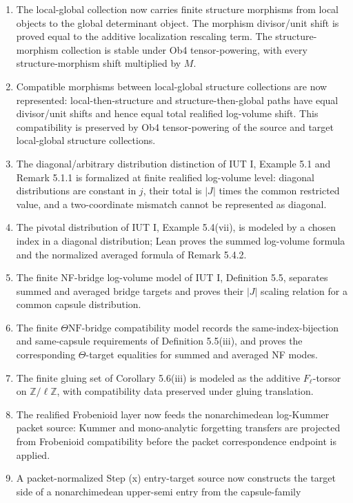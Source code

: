 \documentclass[11pt]{article}
\newcommand{\IUT}{IUT}
\newcommand{\Lean}{Lean}
\theoremstyle{plain}
\theoremstyle{definition}
\theoremstyle{remark}
\begin{document}
\begin{enumerate}
\item The local-global collection now carries finite structure morphisms from
  local objects to the global determinant object.  The morphism divisor/unit
  shift is proved equal to the additive localization rescaling term.  The
  structure-morphism collection is stable under Ob4 tensor-powering, with every
  structure-morphism shift multiplied by \(M\).
\item Compatible morphisms between local-global structure collections are now
  represented: local-then-structure and structure-then-global paths have equal
  divisor/unit shifts and hence equal total realified log-volume shift.  This
  compatibility is preserved by Ob4 tensor-powering of the source and target
  local-global structure collections.
\item The diagonal/arbitrary distribution distinction of \IUT{} I, Example 5.1
  and Remark 5.1.1 is formalized at finite realified log-volume level:
  diagonal distributions are constant in \(j\), their total is
  \(|J|\) times the common restricted value, and a two-coordinate mismatch
  cannot be represented as diagonal.
\item The pivotal distribution of \IUT{} I, Example 5.4(vii), is modeled by a
  chosen index in a diagonal distribution; \Lean{} proves the summed
  log-volume formula and the normalized averaged formula of Remark 5.4.2.
\item The finite NF-bridge log-volume model of \IUT{} I, Definition 5.5,
  separates summed and averaged bridge targets and proves their \(|J|\)
  scaling relation for a common capsule distribution.
\item The finite \(\Theta\mathrm{NF}\)-bridge compatibility model records the
  same-index-bijection and same-capsule requirements of Definition 5.5(iii),
  and proves the corresponding \(\Theta\)-target equalities for summed and
  averaged NF modes.
\item The finite gluing set of Corollary 5.6(iii) is modeled as the additive
  \(F_\ell\)-torsor on \(\mathbb{Z}/\ell\mathbb{Z}\), with compatibility data
  preserved under gluing translation.
\item The realified Frobenioid layer now feeds the nonarchimedean
  log-Kummer packet source: Kummer and mono-analytic forgetting transfers are
  projected from Frobenioid compatibility before the packet correspondence
  endpoint is applied.
\item A packet-normalized Step (x) entry-target source now constructs the
  target side of a nonarchimedean upper-semi entry from the capsule-family

\end{enumerate}
\end{document}
